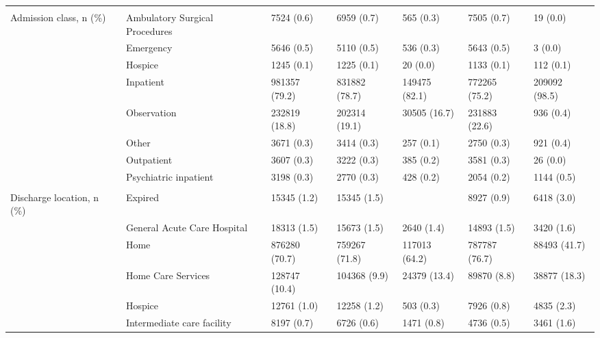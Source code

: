 \begin{adjustbox}{width={\textwidth},totalheight={\textheight},keepaspectratio,frame}
{\begin{tabular}{L{20em}C{10em}C{10em}C{10em}C{10em}C{10em}}
 &  &  &  &  &  & \\
Admission class, n (\%) & \hspace{3mm} Ambulatory Surgical Procedures & 7524 (0.6) & 6959 (0.7) & 565 (0.3) & 7505 (0.7) & 19 (0.0)\\
 & \hspace{3mm} Emergency & 5646 (0.5) & 5110 (0.5) & 536 (0.3) & 5643 (0.5) & 3 (0.0)\\
 & \hspace{3mm} Hospice & 1245 (0.1) & 1225 (0.1) & 20 (0.0) & 1133 (0.1) & 112 (0.1)\\
 & \hspace{3mm} Inpatient & 981357 (79.2) & 831882 (78.7) & 149475 (82.1) & 772265 (75.2) & 209092 (98.5)\\
 & \hspace{3mm} Observation & 232819 (18.8) & 202314 (19.1) & 30505 (16.7) & 231883 (22.6) & 936 (0.4)\\
 & \hspace{3mm} Other & 3671 (0.3) & 3414 (0.3) & 257 (0.1) & 2750 (0.3) & 921 (0.4)\\
 & \hspace{3mm} Outpatient & 3607 (0.3) & 3222 (0.3) & 385 (0.2) & 3581 (0.3) & 26 (0.0)\\
 & \hspace{3mm} Psychiatric inpatient & 3198 (0.3) & 2770 (0.3) & 428 (0.2) & 2054 (0.2) & 1144 (0.5)\\
 &  &  &  &  &  & \\
Discharge location, n (\%) & \hspace{3mm} Expired & 15345 (1.2) & 15345 (1.5) &  & 8927 (0.9) & 6418 (3.0)\\
 & \hspace{3mm} General Acute Care Hospital & 18313 (1.5) & 15673 (1.5) & 2640 (1.4) & 14893 (1.5) & 3420 (1.6)\\
 & \hspace{3mm} Home & 876280 (70.7) & 759267 (71.8) & 117013 (64.2) & 787787 (76.7) & 88493 (41.7)\\
 & \hspace{3mm} Home Care Services & 128747 (10.4) & 104368 (9.9) & 24379 (13.4) & 89870 (8.8) & 38877 (18.3)\\
 & \hspace{3mm} Hospice & 12761 (1.0) & 12258 (1.2) & 503 (0.3) & 7926 (0.8) & 4835 (2.3)\\
 & \hspace{3mm} Intermediate care facility & 8197 (0.7) & 6726 (0.6) & 1471 (0.8) & 4736 (0.5) & 3461 (1.6)\\

\end{tabular}}
\end{adjustbox}
